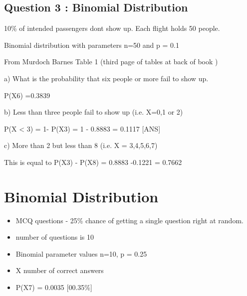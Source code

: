 \documentclass[]{article}
\begin{document}
\subsection{Question 3 : Binomial Distribution}

10\% of intended passengers dont show up. Each flight holds 50 people.

Binomial distribution with parameters n=50 and p = 0.1

From Murdoch Barnes Table 1 (third page of tables at back of book )


a) What is the probability that six people or more fail to show up.

P(X6) =0.3839


b) Less than three people fail to show up (i.e. X=0,1 or 2)

P(X < 3) = 1- P(X3) =    1 - 0.8883  = 0.1117 [ANS]


c) More than 2 but less than 8   (i.e. X = 3,4,5,6,7)

This is equal to P(X3) - P(X8) = 0.8883 -0.1221 =  0.7662


\section{Binomial Distribution}

\begin{itemize}

\item MCQ questions  - 25\% chance of getting a single question right at random.

\item number of questions is 10

\item 
Binomial parameter values n=10, p = 0.25

\item
X number of correct answers
\item 

P(X7) = 0.0035        [00.35\%]

\end{itemize}
\end{document}
